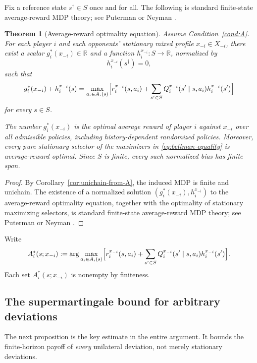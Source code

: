\documentclass[11pt]{article}
\newtheorem{theorem}{Theorem}[section]
\theoremstyle{definition}
\newcommand{\R}{\mathbb{R}}
\newcommand{\1}{\mathbf{1}}
\begin{document}
Fix a reference state $s^\dagger\in S$ once and for all. The following is standard finite-state average-reward MDP theory; see Puterman \cite[Chapter~8]{Puterman1994} or Neyman \cite[Section~3]{Neyman2003MarkovChains}.

\begin{theorem}[Average-reward optimality equation]\label{thm:aroe}
Assume Condition~\ref{cond:A}. For each player $i$ and each opponents' stationary mixed profile $x_{-i}\in X_{-i}$, there exist a scalar $g_i^*(x_{-i})\in\R$ and a function $h_i^{x_{-i}}:S\to\R$, normalized by
\[
h_i^{x_{-i}}(s^\dagger)=0,
\]
such that
\begin{equation}\label{eq:bellman-equality}
g_i^*(x_{-i})+h_i^{x_{-i}}(s)
=\max_{a_i\in A_i(s)}\Bigl[r_i^{x_{-i}}(s,a_i)+\sum_{s'\in S}Q_i^{x_{-i}}(s'\mid s,a_i)h_i^{x_{-i}}(s')\Bigr]
\end{equation}
for every $s\in S$.

The number $g_i^*(x_{-i})$ is the optimal average reward of player $i$ against $x_{-i}$ over all admissible policies, including history-dependent randomized policies. Moreover, every pure stationary selector of the maximizers in \eqref{eq:bellman-equality} is average-reward optimal. Since $S$ is finite, every such normalized bias has finite span.
\end{theorem}

\begin{proof}
By Corollary~\ref{cor:unichain-from-A}, the induced MDP is finite and unichain. The existence of a normalized solution $(g_i^*(x_{-i}),h_i^{x_{-i}})$ to the average-reward optimality equation, together with the optimality of stationary maximizing selectors, is standard finite-state average-reward MDP theory; see Puterman \cite[Chapter~8]{Puterman1994} or Neyman \cite[Section~3]{Neyman2003MarkovChains}.
\end{proof}

Write
\[
A_i^*(s;x_{-i})
:=\arg\max_{a_i\in A_i(s)}\Bigl[r_i^{x_{-i}}(s,a_i)+\sum_{s'\in S}Q_i^{x_{-i}}(s'\mid s,a_i)h_i^{x_{-i}}(s')\Bigr].
\]
Each set $A_i^*(s;x_{-i})$ is nonempty by finiteness.

\subsection{The supermartingale bound for arbitrary deviations}

The next proposition is the key estimate in the entire argument. It bounds the finite-horizon payoff of \emph{every} unilateral deviation, not merely stationary deviations.
\end{document}
